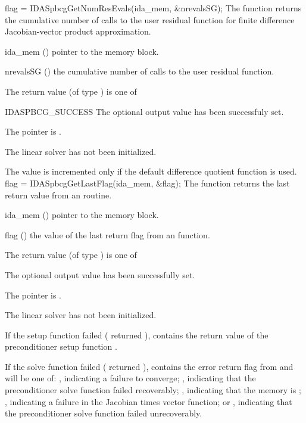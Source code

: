 {}
{
  flag = IDASpbcgGetNumResEvals(ida\_mem, \&nrevalsSG);
}
{
  The function  returns the
  cumulative number of calls to the user residual function for
  finite difference Jacobian-vector product approximation.
}
{
  \begin{args}[nrevalsSG]
  \item[ida\_mem] ()
    pointer to the {\ida} memory block.
  \item[nrevalsSG] ()
    the cumulative number of calls to the user residual function.
  \end{args}
}
{
  The return value  (of type ) is one of
  \begin{args}
  \item[IDASPBCG\_SUCCESS] 
    The optional output value has been successfuly set.
  \item[\Id{IDASPBCG\_MEM\_NULL}]
    The  pointer is .
  \item[\Id{IDASPBCG\_LMEM\_NULL}]
    The {\idaspbcg} linear solver has not been initialized.
  \end{args}
}
{
  The value  is incremented only if the default 
   difference quotient function is used.
}
{
  flag = IDASpbcgGetLastFlag(ida\_mem, \&flag);
}
{
  The function  returns the
  last return value from an {\idaspbcg} routine. 
}
{
  \begin{args}
  \item[ida\_mem] ()
    pointer to the {\ida} memory block.
  \item[flag] ()
    the value of the last return flag from an {\idaspbcg} function.
  \end{args}
}
{
  The return value  (of type ) is one of
  \begin{args}
  \item[\Id{IDASPBCG\_SUCCESS}] 
    The optional output value has been successfully set.
  \item[\Id{IDASPBCG\_MEM\_NULL}]
    The  pointer is .
  \item[\Id{IDASPBCG\_LMEM\_NULL}]
    The {\idaspbcg} linear solver has not been initialized.
  \end{args}
}
{
  If the {\idaspbcg} setup function failed ( 
  returned ),
   contains the return value of the preconditioner 
  setup function .

  If the {\idaspbcg} solve function failed ( returned 
  ),  contains the error return flag from
   and will be one of:
  , indicating a failure to converge;
  , indicating that the preconditioner solve
  function  failed recoverably;
  , indicating that the {\spbcg} memory is ;
  , indicating a failure in the Jacobian times vector 
  function; or
  , indicating that the preconditioner solve
  function  failed unrecoverably.
}
